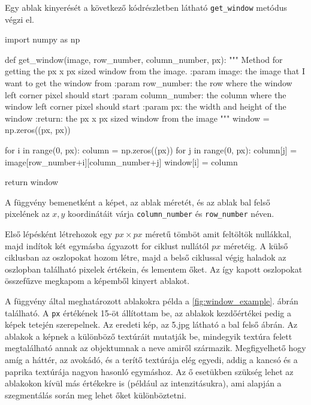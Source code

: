 Egy ablak kinyerését a következő kódrészletben látható \texttt{get\_window} metódus végzi el.
\begin{python}
import numpy as np

def get_window(image, row_number, column_number, px):
    """
    Method for getting the px x px sized window from the image.
    :param image: the image that I want to get the window from
    :param row_number: the row where the window left corner pixel
        should start
    :param column_number: the column where the window left corner pixel
        should start
    :param px: the width and height of the window
    :return: the px x px sized window from the image
    """
    window = np.zeros((px, px))

    for i in range(0, px):
        column = np.zeros((px))
        for j in range(0, px):
            column[j] = image[row_number+i][column_number+j]
        window[i] = column

    return window
\end{python}

A függvény bemenetként a képet, az ablak méretét, és az ablak bal felső pixelének az $x, y$ koordinátáit várja \texttt{column\_number} és \texttt{row\_number} néven.

Első lépésként létrehozok egy $px \times px$ méretű tömböt amit feltöltök nullákkal, majd indítok két egymásba ágyazott for ciklust nullától $px$ méretéig. A külső ciklusban az oszlopokat hozom létre, majd a belső ciklussal végig haladok az oszlopban található pixelek értékein, és lementem őket. Az így kapott oszlopokat összefűzve megkapom a képemből kinyert ablakot.

A függvény által meghatározott ablakokra példa a \ref{fig:window_example}. ábrán található. A \texttt{px} értékének 15-öt állítottam be, az ablakok kezdőértékei pedig a képek tetején szerepelnek. Az eredeti kép, az 5.jpg látható a bal felső ábrán. Az ablakok a képnek a különböző textúráit mutatják be, mindegyik textúra felett megtalálható annak az objektumnak a neve amiről származik. Megfigyelhető hogy amíg a háttér, az avokádó, és a terítő textúrája elég egyedi, addig a kancsó és a paprika textúrája nagyon hasonló egymáshoz. Az ő esetükben szükség lehet az ablakokon kívül más értékekre is (például az intenzitásukra), ami alapján a szegmentálás során meg lehet őket különböztetni.

